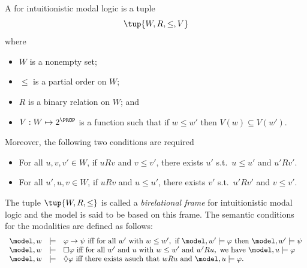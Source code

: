 \begin{definition}
  A  for intuitionistic modal logic is a tuple
  $$
  \tup{W, R, \le, V}
  $$
where
\begin{itemize}
  \item $W$ is a nonempty set;
  \item $\le$ is a partial order on $W$;
  \item $R$ is a  binary relation on $W$; and
  \item $V : W \mapsto 2^\PROP$ is a function such that
    if $w \le w'$ then $V(w) \subseteq V(w')$.
\end{itemize}
    
Moreover, the following two conditions are required
  \begin{itemize}
  \item[(F1)] For all $u, v, v' \in W$, if $uRv$ and $v \le v'$, there
    exists $u'$ s.t.\ $u \le u'$ and $u'Rv'$.

\item[(F2)] For all $u', u, v \in W$, if $uRv$ and $u \le u'$, there exists $v'$ s.t.\ $u'Rv'$ and $v \le v'$.
\end{itemize}

The tuple $\tup{W,R,\le}$ is called a \emph{birelational frame} for
intuitionistic modal logic and the model is said to be based on this
frame.  The semantic conditions for the modalities are defined as follows:
   $$
    \begin{array}{rcl}
      \model, w & \models & \varphi \to \psi
       \text{ iff for all } w' \text{ with } w \le w', \text{ if } \model, w' \models \varphi \text{ then } \model, w' \models \psi\\
      \model, w & \models & \Box \varphi \text{ iff for all } w' \text{ and } u \text{ with } w \le w' \text{ and } w'Ru, \text{ we have } \model, u \models \varphi\\
      \model, w & \models & \Diamond \varphi \text{ iff there exists } u \text{such that } wRu \text{ and } \model, u \models \varphi.
    \end{array}
    $$
\end{definition}



